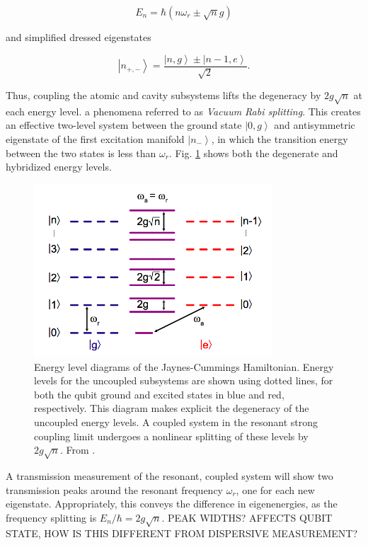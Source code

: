 \documentclass[11 pt, oneside]{book} %
\newcommand{\ket}[1]{\left| #1 \right>} %
\begin{document}
\begin{equation}\label{eq:NonlinearEnergies}
E_n = \hbar(n\omega_r\pm \sqrt{n}g)
\end{equation}

and simplified dressed eigenstates

\begin{equation}
\ket{n_{+,-}} = \frac{\ket{n,g}\pm\ket{n-1,e}}{\sqrt{2}}.
\end{equation}

Thus, coupling the atomic and cavity subsystems lifts the degeneracy by $2g\sqrt{n}$ at each energy level. a phenomena referred to as \emph{Vacuum Rabi splitting}. This creates an effective two-level system between the ground state $\ket{0,g}$ and antisymmetric eigenstate of the first excitation manifold $\ket{n_-}$, in which the transition energy between the two states is less than $\omega_r$. Fig. \ref{fig:EnergyLevels} shows both the degenerate and hybridized energy levels. 

\begin{figure}[h] 
   \centering
   \includegraphics[width=3.5in]{SchusterResonantEnergyLevels.png} 
   \caption[Energy levels of JC Hamiltonian]{Energy level diagrams of the Jaynes-Cummings Hamiltonian. Energy levels for the uncoupled subsystems are shown using dotted lines, for both the qubit ground and excited states in blue and red, respectively. This diagram makes explicit the degeneracy of the uncoupled energy levels. A coupled system in the resonant strong coupling limit undergoes a nonlinear splitting of these levels by $2g\sqrt{n}$. From \cite{Schuster}.}
   \label{fig:EnergyLevels}
\end{figure}

A transmission measurement of the resonant, coupled system will show two transmission peaks around the resonant frequency $\omega_r$, one for each new eigenstate. Appropriately, this conveys the difference in eigenenergies, as the frequency splitting is $E_n/\hbar=2g\sqrt{n}$. PEAK WIDTHS? AFFECTS QUBIT STATE, HOW IS THIS DIFFERENT FROM DISPERSIVE MEASUREMENT?
\end{document}
